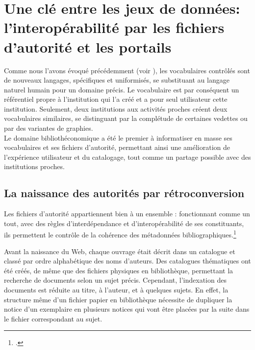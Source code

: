 \section{\label{I-A-3}Une clé entre les jeux de données: l'interopérabilité par les fichiers d'autorité et les portails}

Comme nous l'avons évoqué précédemment (voir ), les vocabulaires contrôlés sont de nouveaux langages, spécifiques et uniformisés, se substituant au langage naturel humain pour un domaine précis. Le vocabulaire est par conséquent un référentiel propre à l'institution qui l'a créé et a pour seul utilisateur cette institution. Seulement, deux institutions aux activités proches créent deux vocabulaires similaires, se distinguant par la complétude de certaines vedettes ou par des variantes de graphies.\\

Le domaine bibliothéconomique a été le premier à informatiser en masse ses vocabulaires et ses fichiers d'autorité, permettant ainsi une amélioration de l'expérience utilisateur et du catalogage, tout comme un partage possible avec des institutions proches.

\subsection{\label{I-A-3-a}La naissance des autorités par rétroconversion}

\begin{citationLongue}
	Les fichiers d'autorité appartiennent bien à un	ensemble : fonctionnant comme un tout, avec des règles d’interdépendance et d’interopérabilité de ses constituants, ils permettent le contrôle de la cohérence des métadonnées bibliographiques.\footcite[p.6]{aymonin_arabesques_2017}
\end{citationLongue}

Avant la naissance du Web, chaque ouvrage était décrit dans un catalogue et classé par ordre alphabétique des noms d'auteurs. Des catalogues thématiques ont été créés, de même que des fichiers physiques en bibliothèque, permettant la recherche de documents selon un sujet précis. Cependant, l'indexation des documents est réduite au titre, à l'auteur, et à quelques sujets. En effet, la structure même d'un fichier papier en bibliothèque nécessite de dupliquer la notice d'un exemplaire en plusieurs notices qui vont être placées par la suite dans le fichier correspondant au sujet.\\

